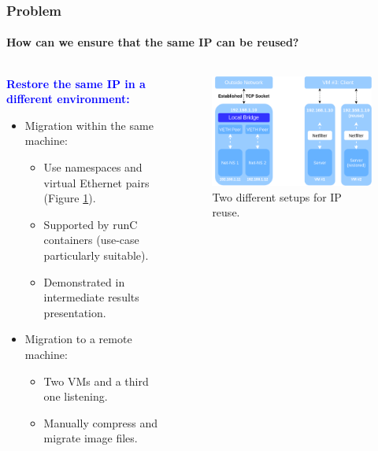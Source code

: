 \documentclass[9pt,    %
    english,            %
    xcolor=table,       %
    envcountsect,        %
    aspectratio=169     %
]{beamer}
\begin{document}
\begin{frame}
    \frametitle{Problem}
    \framesubtitle{How can we ensure that the same IP can be reused?}

    \begin{columns}
        \begin{column}{.45\textwidth}
            \textbf{\textcolor{blue}{Restore the same IP in a different environment:}}
            \begin{itemize}
                \item Migration within the same machine:
                \begin{itemize}
                    \item Use namespaces and virtual Ethernet pairs (Figure \ref{fig:architecture}).
                    \item Supported by runC containers (use-case particularly suitable).
                    \item Demonstrated in intermediate results presentation.
                \end{itemize}
                \vspace{5pt}
                \item Migration to a remote machine:
                \begin{itemize}
                    \item Two VMs and a third one listening.
                    \item Manually compress and migrate image files.
                \end{itemize}
            \end{itemize}
        \end{column}
        \begin{column}{.55\textwidth}
            \vspace{-20pt}
            \begin{figure}[t!]
                \includegraphics[width=.85\textwidth]{./images/architecture.png}
                \caption{Two different setups for IP reuse.\label{fig:architecture}}
            \end{figure}
        \end{column}
    \end{columns}
    
\end{frame}
\end{document}
